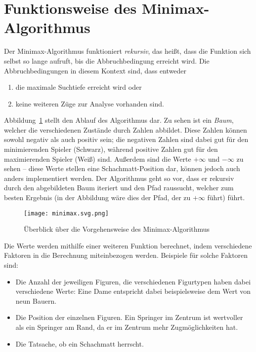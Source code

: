 \section{Funktionsweise des Minimax-Algorithmus}
Der Minimax-Algorithmus funktioniert \textit{rekursiv}, das heißt, dass die Funktion sich selbst so lange aufruft, bis die Abbruchbedingung erreicht wird. Die Abbruchbedingungen in diesem Kontext sind, dass entweder 

\begin{enumerate}
    \item die maximale Suchtiefe erreicht wird oder
    \item keine weiteren Züge zur Analyse vorhanden sind.
\end{enumerate}

Abbildung~\ref{fig:minimax} stellt den Ablauf des Algorithmus dar. Zu sehen ist ein \textit{Baum}, welcher die verschiedenen Zustände durch Zahlen abbildet. Diese Zahlen können sowohl negativ als auch positiv sein; die negativen Zahlen sind dabei gut für den minimierenden Spieler (Schwarz), während positive Zahlen gut für den maximierenden Spieler (Weiß) sind. Außerdem sind die Werte $+\infty$ und $-\infty$ zu sehen -- diese Werte stellen eine Schachmatt-Position dar, können jedoch auch anders implementiert werden. Der Algorithmus geht so vor, dass er rekursiv durch den abgebildeten Baum iteriert und den Pfad raussucht, welcher zum besten Ergebnis (in der Abbildung wäre dies der Pfad, der zu $+\infty$ führt) führt.

\begin{figure}[H]
	\texttt{[image: minimax.svg.png]}
	\caption{Überblick über die Vorgehensweise des Minimax-Algorithmus\footnotemark}
	\label{fig:minimax}
\end{figure}

Die Werte werden mithilfe einer weiteren Funktion berechnet, indem verschiedene Faktoren in die Berechnung miteinbezogen werden. Beispiele für solche Faktoren sind:

\begin{itemize}
    \item Die Anzahl der jeweiligen Figuren, die verschiedenen Figurtypen haben dabei verschiedene Werte: Eine Dame entspricht dabei beispielsweise dem Wert von neun Bauern.
    \item Die Position der einzelnen Figuren. Ein Springer im Zentrum ist wertvoller als ein Springer am Rand, da er im Zentrum mehr Zugmöglichkeiten hat.
    \item Die Tatsache, ob ein Schachmatt herrscht.
\end{itemize}

